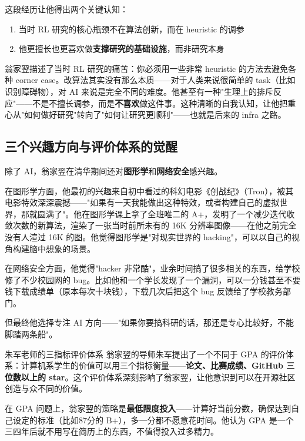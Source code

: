 这段经历让他得出两个关键认知：
\begin{enumerate}
    \item 当时 RL 研究的核心瓶颈不在算法创新，而在 heuristic 的调参
    \item 他更擅长也更喜欢做\textbf{支撑研究的基础设施}，而非研究本身
\end{enumerate}

翁家翌描述了当时 RL 研究的痛苦：你必须用一些非常 heuristic 的方法去避免各种 corner case。改算法其实没有那么本质——对于人类来说很简单的 task（比如识别障碍物），对 AI 来说是完全不同的难度。他甚至有一种"生理上的排斥反应"——不是不擅长调参，而是\textbf{不喜欢}做这件事。这种清晰的自我认知，让他把重心从"如何做好研究"转向了"如何让研究更顺利"——也就是后来的 infra 之路。

\subsection{三个兴趣方向与评价体系的觉醒}

除了 AI，翁家翌在清华期间还对\textbf{图形学}和\textbf{网络安全}感兴趣。

在图形学方面，他最初的兴趣来自初中看过的科幻电影《创战纪》（Tron），被其电影特效深深震撼——"如果有一天我能做出这种特效，或者构建自己的虚拟世界，那就圆满了"。他在图形学课上拿了全班唯二的 A+，发明了一个减少迭代收敛次数的新算法，渲染了一张当时前所未有的 16K 分辨率图像——在他之前完全没有人渲过 16K 的图。他觉得图形学是"对现实世界的 hacking"，可以以自己的视角构建脑中想象的场景。

在网络安全方面，他觉得"hacker 非常酷"，业余时间搞了很多相关的东西，给学校修了不少校园网的 bug。比如他和一个学长发现了一个漏洞，可以一分钱甚至不要钱下载成绩单（原本每次十块钱），下载几次后把这个 bug 反馈给了学校教务部门。

但最终他选择专注 AI 方向——"如果你要搞科研的话，那还是专心比较好，不能脚踏两条船"。

\begin{knowledgebox}{朱军老师的三指标评价体系}
翁家翌的导师朱军提出了一个不同于 GPA 的评价体系：计算机系学生的价值可以用三个指标衡量——\textbf{论文、比赛成绩、GitHub 三位数以上的 star}。这个评价体系深刻影响了翁家翌，让他意识到可以在开源社区创造与众不同的价值。
\end{knowledgebox}

在 GPA 问题上，翁家翌的策略是\textbf{最低限度投入}——计算好当前分数，确保达到自己设定的标准（比如87分的 B+），多一分都不愿意花时间。他认为 GPA 是一个三四年后就不用写在简历上的东西，不值得投入过多精力。

